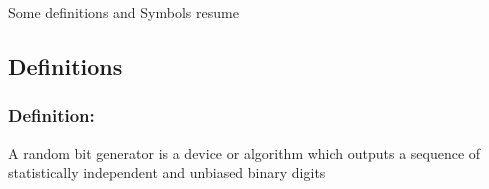 \label{Terminologies and Basic Recall}
Some definitions and Symbols resume
\subsection{Definitions}
 
\subsubsection{Definition:} 
A random bit generator is a device or algorithm which outputs a sequence of statistically independent and unbiased binary digits